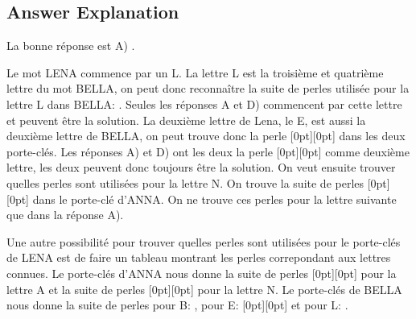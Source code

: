 \documentclass[a4paper,11pt]{report}
\newcommand{\taskGraphicsFolder}{..}
\begin{document}
\endgroup

\subsection*{Answer Explanation}

La bonne réponse est A) \raisebox{\dimexpr -0.5ex -1.5ex \relax}{}.

Le mot LENA commence par un L. La lettre L est la troisième et quatrième lettre du mot BELLA, on peut donc reconnaître la suite de perles utilisée pour la lettre L dans BELLA: \raisebox{-0.5ex}{}. Seules les réponses A et D) commencent par cette lettre et peuvent être la solution. La deuxième lettre de Lena, le E, est aussi la deuxième lettre de BELLA, on peut trouve donc la perle \raisebox{-0.5ex}[0pt][0pt]{} dans les deux porte-clés. Les réponses A) et D) ont les deux la perle \raisebox{-0.5ex}[0pt][0pt]{} comme deuxième lettre, les deux peuvent donc toujours être la solution. On veut ensuite trouver quelles perles sont utilisées pour la lettre N. On trouve la suite de perles \raisebox{-0.5ex}[0pt][0pt]{} dans le porte-clé d’ANNA. On ne trouve ces perles pour la lettre suivante que dans la réponse A).

Une autre possibilité pour trouver quelles perles sont utilisées pour le porte-clés de LENA est de faire un tableau montrant les perles correpondant aux lettres connues. Le porte-clés d’ANNA nous donne la suite de perles \raisebox{-0.5ex}[0pt][0pt]{} pour la lettre A et la suite de perles \raisebox{-0.5ex}[0pt][0pt]{} pour la lettre N. Le porte-clés de BELLA nous donne la suite de perles pour B: \raisebox{-0.5ex}{}, pour E: \raisebox{-0.5ex}[0pt][0pt]{} et pour L: \raisebox{-0.5ex}{}.
\end{document}
